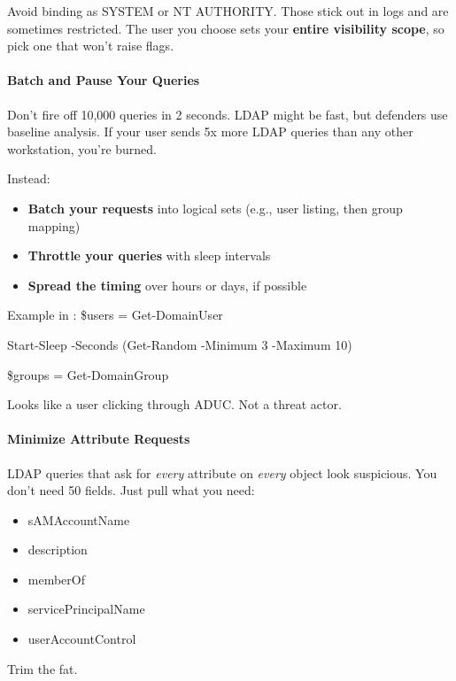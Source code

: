 Avoid binding as SYSTEM or NT AUTHORITY. Those stick out in logs and are sometimes restricted. The user you choose sets your \textbf{entire visibility scope}, so pick one that won’t raise flags.

\paragraph{\textbf{   Batch and Pause Your Queries}}

Don’t fire off 10,000 queries in 2 seconds. LDAP might be fast, but defenders use baseline analysis. If your user sends 5x more LDAP queries than any other workstation, you’re burned.

Instead:

\begin{itemize}
    \item \textbf{Batch your requests} into logical sets (e.g., user listing, then group mapping)

    \item \textbf{Throttle your queries} with sleep intervals

    \item \textbf{Spread the timing} over hours or days, if possible

\end{itemize}
Example in  :
\$users = Get-DomainUser

Start-Sleep -Seconds (Get-Random -Minimum 3 -Maximum 10)

\$groups = Get-DomainGroup

Looks like a user clicking through ADUC. Not a threat actor.

\paragraph{\textbf{   Minimize Attribute Requests}}

LDAP queries that ask for \textit{every} attribute on \textit{every} object look suspicious. You don’t need 50 fields. Just pull what you need:

\begin{itemize}
    \item sAMAccountName

    \item description

    \item memberOf

    \item servicePrincipalName

    \item userAccountControl

\end{itemize}
Trim the fat.

